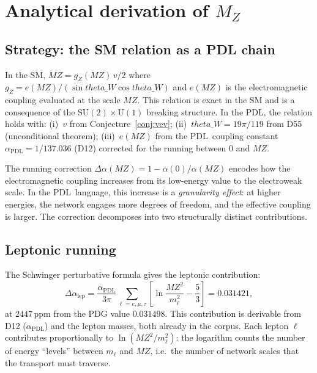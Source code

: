 \documentclass[12pt,a4paper]{article}
\theoremstyle{remark}
\newcommand{\PDL}{\textsc{pdl}}
\newcommand{\thetaW}{\theta_{W}}
\newcommand{\Dalep}{\Delta\alpha_{\mathrm{lep}}}
\newcommand{\MZ}{M_{Z}}
\newcommand{\vev}{v}
\newcommand{\alphaPDL}{\alpha_{\mathrm{PDL}}}
\newcommand{\ppm}{\,\mathrm{ppm}}
\def\PDL{PDL}%
\def\MZ{MZ}%
\def\thetaW{theta\_W}%
\begin{document}
\section{Analytical derivation of \texorpdfstring{$M_Z$}{MZ}}

\subsection{Strategy: the SM relation as a PDL chain}

In the SM, $\MZ = g_{Z}(\MZ)\,\vev/2$ where $g_{Z}=e(\MZ)/(\sin\thetaW\cos\thetaW)$
and $e(\MZ)$ is the electromagnetic coupling evaluated at the scale $\MZ$.
This relation is exact in the SM and is a consequence of the $\mathrm{SU}(2)
\times\mathrm{U}(1)$ breaking structure. In the \PDL, the relation holds with:
(i)~$\vev$ from Conjecture~\ref{conj:vev}; (ii)~$\thetaW=19\pi/119$ from D55
(unconditional theorem); (iii)~$e(\MZ)$ from the \PDL\ coupling constant
$\alphaPDL=1/137.036$ (D12) corrected for the running between $0$ and $\MZ$.

The running correction $\Delta\alpha(\MZ)=1-\alpha(0)/\alpha(\MZ)$ encodes how
the electromagnetic coupling increases from its low-energy value to the
electroweak scale. In the \PDL\ language, this increase is a \emph{granularity
effect}: at higher energies, the network engages more degrees of freedom, and
the effective coupling is larger. The correction decomposes into two structurally
distinct contributions.

\subsection{Leptonic running}

The Schwinger perturbative formula gives the leptonic contribution:
\begin{equation}\label{eq:dalep}
\Dalep = \frac{\alphaPDL}{3\pi}\sum_{\ell=e,\mu,\tau}
\!\left[\ln\frac{\MZ^{2}}{m_{\ell}^{2}}-\frac{5}{3}\right] = 0.031421,
\end{equation}
at $2447\ppm$ from the PDG value $0.031498$. This contribution is derivable
from D12 ($\alphaPDL$) and the lepton masses, both already in the corpus.
Each lepton $\ell$ contributes proportionally to $\ln(\MZ^{2}/m_{\ell}^{2})$:
the logarithm counts the number of energy ``levels'' between $m_{\ell}$ and
$\MZ$, i.e.\ the number of network scales that the transport must traverse.
\end{document}
